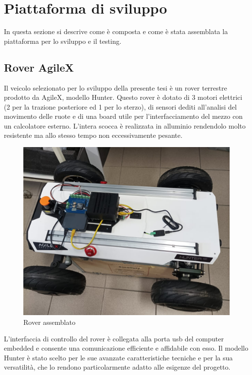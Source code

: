 \section{Piattaforma di sviluppo}
In questa sezione si descrive come è composta e come è stata assemblata la piattaforma per lo sviluppo e il testing.

\subsection{Rover AgileX}
Il veicolo selezionato per lo sviluppo della presente tesi è un rover terrestre prodotto da AgileX, modello Hunter. Questo rover è dotato di 3 motori elettrici (2 per la trazione posteriore ed 1 per lo sterzo), di sensori dediti all'analisi del movimento delle ruote e di una board utile per l'interfacciamento del mezzo con un calcolatore esterno. L'intera scocca è realizzata in alluminio rendendolo molto resistente ma allo stesso tempo non eccessivamente pesante.

\begin{figure}[h!]
  \centering
  \includegraphics[width=1\textwidth]{figures/franco.png}
  \caption{Rover assemblato}
  \label{Rover assemblato}
\end{figure}

\noindent L'interfaccia di controllo del rover è collegata alla porta usb del computer embedded e consente una comunicazione efficiente e affidabile con esso. Il modello Hunter è stato scelto per le sue avanzate caratteristiche tecniche e per la sua versatilità, che lo rendono particolarmente adatto alle esigenze del progetto.

